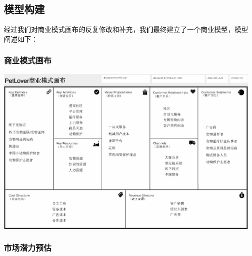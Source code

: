 \documentclass[a4paper]{ctexart}
\begin{document}
\subsection{模型构建}

经过我们对商业模式画布的反复修改和补充，我们最终建立了一个商业模型，模型阐述如下：

\subsubsection{商业模式画布}

\begin{center}
  \includegraphics[width=16cm]{the-business-model-canvas}
\end{center}

\subsubsection{市场潜力预估}
\end{document}
